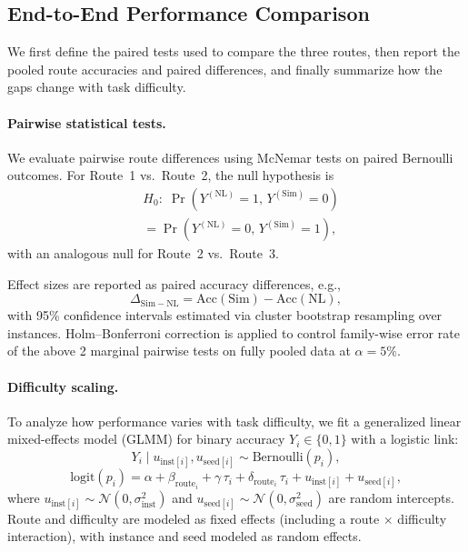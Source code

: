 


\subsection{End-to-End Performance Comparison}
\label{sec:performance}

We first define the paired tests used to compare the three routes, then report
the pooled route accuracies and paired differences, and finally summarize how
the gaps change with task difficulty.

\paragraph{Pairwise statistical tests.}
We evaluate pairwise route differences using McNemar tests on paired
Bernoulli outcomes.
For Route~1 vs.\ Route~2, the null hypothesis is
\begin{align*}
& H_0:\;
\Pr(Y^{(\mathrm{NL})}=1,\,Y^{(\mathrm{Sim})}=0) \\
& =
\Pr(Y^{(\mathrm{NL})}=0,\,Y^{(\mathrm{Sim})}=1),
\end{align*}
with an analogous null for Route~2 vs.\ Route~3.

Effect sizes are reported as paired accuracy differences, e.g.,
\[
\Delta_{\mathrm{Sim-NL}}
=
\mathrm{Acc}(\mathrm{Sim}) - \mathrm{Acc}(\mathrm{NL}),
\]
with 95\% confidence intervals estimated via cluster bootstrap
resampling over instances.
Holm--Bonferroni correction is applied to control family-wise error rate of the above 2 marginal pairwise tests on fully pooled data
at $\alpha=5\%$. %

\paragraph{Difficulty scaling.}
To analyze how performance varies with task difficulty, we fit a generalized linear mixed-effects model (GLMM)
for binary accuracy $Y_i \in \{0,1\}$ with a logistic link:
\[
Y_i \mid u_{\text{inst}[i]}, u_{\text{seed}[i]} \sim \mathrm{Bernoulli}(p_i),
\]
\[
\mathrm{logit}(p_i)
=
\alpha
+
\beta_{\mathrm{route}_i}
+
\gamma\,\tau_i
+
\delta_{\mathrm{route}_i}\,\tau_i
+
u_{\text{inst}[i]}
+
u_{\text{seed}[i]},
\]
where $u_{\text{inst}[i]} \sim \mathcal{N}(0,\sigma^2_{\text{inst}})$ and
$u_{\text{seed}[i]} \sim \mathcal{N}(0,\sigma^2_{\text{seed}})$ are random intercepts.
Route and difficulty are modeled as fixed effects (including a route $\times$ difficulty interaction),
with instance and seed modeled as random effects.

